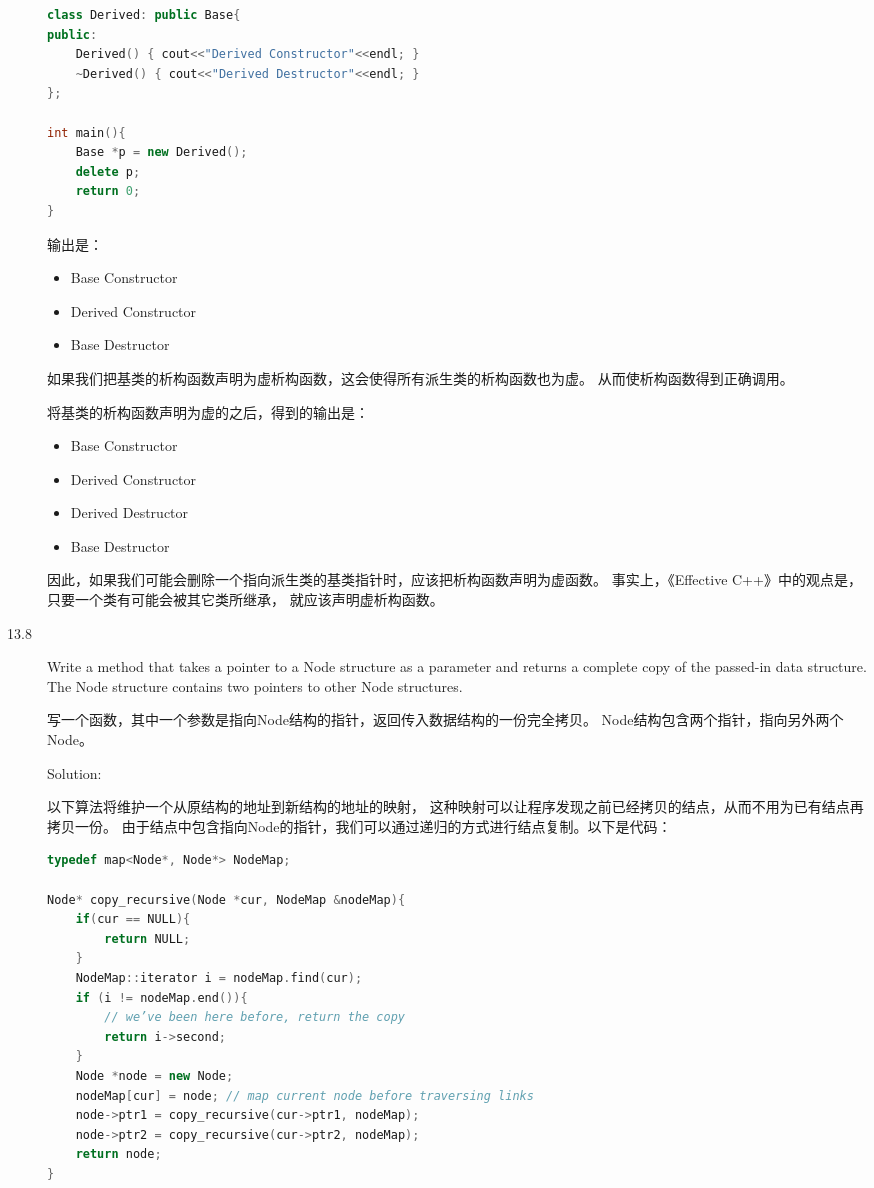 \begin{description}
\begin{lstlisting}[language=C++]
class Derived: public Base{
public:
    Derived() { cout<<"Derived Constructor"<<endl; }
    ~Derived() { cout<<"Derived Destructor"<<endl; }
};

int main(){
    Base *p = new Derived();
    delete p;
    return 0;
}
\end{lstlisting}
输出是：
\begin{itemize}
  \itemsep=-3pt
\item Base Constructor
\item Derived Constructor
\item Base Destructor
\end{itemize}
如果我们把基类的析构函数声明为虚析构函数，这会使得所有派生类的析构函数也为虚。 从而使析构函数得到正确调用。

将基类的析构函数声明为虚的之后，得到的输出是：
\begin{itemize}
  \itemsep=-3pt
\item Base Constructor
\item Derived Constructor
\item Derived Destructor
\item Base Destructor
\end{itemize}
因此，如果我们可能会删除一个指向派生类的基类指针时，应该把析构函数声明为虚函数。 事实上，《Effective C++》中的观点是，只要一个类有可能会被其它类所继承， 就应该声明虚析构函数。


\item[13.8] Write a method that takes a pointer to a Node structure as a parameter and returns a complete copy of the passed-in data structure. The Node structure contains two pointers to other Node structures.

写一个函数，其中一个参数是指向Node结构的指针，返回传入数据结构的一份完全拷贝。 Node结构包含两个指针，指向另外两个Node。

Solution: 

以下算法将维护一个从原结构的地址到新结构的地址的映射， 这种映射可以让程序发现之前已经拷贝的结点，从而不用为已有结点再拷贝一份。 由于结点中包含指向Node的指针，我们可以通过递归的方式进行结点复制。以下是代码：

\begin{lstlisting}[language=C++]
typedef map<Node*, Node*> NodeMap;

Node* copy_recursive(Node *cur, NodeMap &nodeMap){
    if(cur == NULL){
        return NULL;
    }
    NodeMap::iterator i = nodeMap.find(cur);
    if (i != nodeMap.end()){
        // we’ve been here before, return the copy
        return i->second;
    }
    Node *node = new Node;
    nodeMap[cur] = node; // map current node before traversing links
    node->ptr1 = copy_recursive(cur->ptr1, nodeMap);
    node->ptr2 = copy_recursive(cur->ptr2, nodeMap);
    return node;
}


\end{lstlisting}
\end{description}
